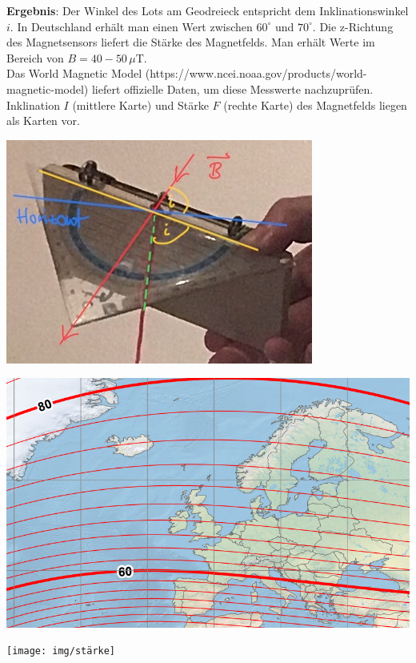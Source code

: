 \documentclass[../main.tex]{subfiles}
\begin{document}
\begin{tcolorbox}
    \vspace{0.5cm}
    \textbf{Ergebnis}: 
    Der Winkel des Lots am Geodreieck entspricht dem Inklinationswinkel $i$. In Deutschland erhält man einen Wert zwischen $60^{\circ}$ und $70^{\circ}$. Die z-Richtung des Magnetsensors liefert die Stärke des Magnetfelds. Man erhält Werte im Bereich von $B=40-50\, \mu$T. \\
    Das \glqq World Magnetic Model\grqq{} (https://www.ncei.noaa.gov/products/world-magnetic-model) liefert offizielle Daten, um diese Messwerte nachzuprüfen. Inklination $I$ (mittlere Karte) und Stärke $F$ (rechte Karte) des Magnetfelds liegen als Karten vor.

    \vspace{0.5cm}
    \begin{center}
        \begin{minipage}[]{0.26\textwidth}
            \includegraphics[width=\textwidth]{img/inklination}  
        \end{minipage}
        \hspace{0.15cm}
        \begin{minipage}[]{0.3\textwidth}
            \includegraphics[width=\textwidth]{img/inklinationskarte}
        \end{minipage}
        \hspace{0.15cm}
        \begin{minipage}[]{0.33\textwidth}
            \texttt{[image: img/stärke]}
        \end{minipage}
    \end{center}


\end{tcolorbox}
\end{document}
